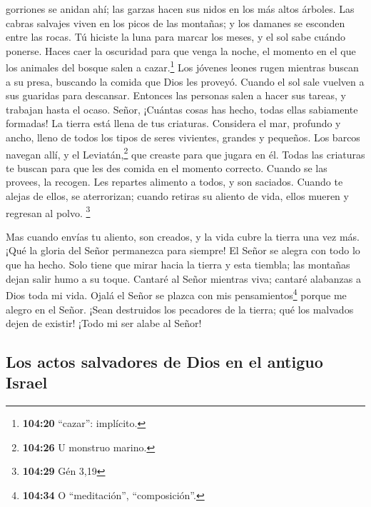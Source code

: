 gorriones se anidan ahí; las garzas hacen sus nidos en los más altos
árboles.  Las cabras salvajes viven en los picos de las
montañas; y los damanes se esconden entre las rocas.  Tú
hiciste la luna para marcar los meses, y el sol sabe cuándo ponerse.
 Haces caer la oscuridad para que venga la noche, el
momento en el que los animales del bosque salen a cazar.\footnote{\textbf{104:20}
  ``cazar'': implícito.}  Los jóvenes leones rugen
mientras buscan a su presa, buscando la comida que Dios les proveyó.
 Cuando el sol sale vuelven a sus guaridas para
descansar.  Entonces las personas salen a hacer sus
tareas, y trabajan hasta el ocaso.  Señor, ¡Cuántas cosas
has hecho, todas ellas sabiamente formadas! La tierra está llena de tus
criaturas.  Considera el mar, profundo y ancho, lleno de
todos los tipos de seres vivientes, grandes y pequeños. 
Los barcos navegan allí, y el Leviatán,\footnote{\textbf{104:26} U
  monstruo marino.} que creaste para que jugara en él. 
Todas las criaturas te buscan para que les des comida en el momento
correcto.  Cuando se las provees, la recogen. Les
repartes alimento a todos, y son saciados.  Cuando te
alejas de ellos, se aterrorizan; cuando retiras su aliento de vida,
ellos mueren y regresan al polvo. \footnote{\textbf{104:29} Gén 3,19}

 Mas cuando envías tu aliento, son creados, y la vida
cubre la tierra una vez más.  ¡Qué la gloria del Señor
permanezca para siempre! El Señor se alegra con todo lo que ha hecho.
 Solo tiene que mirar hacia la tierra y esta tiembla; las
montañas dejan salir humo a su toque.  Cantaré al Señor
mientras viva; cantaré alabanzas a Dios toda mi vida. 
Ojalá el Señor se plazca con mis pensamientos\footnote{\textbf{104:34} O
  ``meditación'', ``composición''.} porque me alegro en el Señor.
 ¡Sean destruidos los pecadores de la tierra; qué los
malvados dejen de existir! ¡Todo mi ser alabe al Señor!

\hypertarget{los-actos-salvadores-de-dios-en-el-antiguo-israel}{%
\subsection{Los actos salvadores de Dios en el antiguo
Israel}\label{los-actos-salvadores-de-dios-en-el-antiguo-israel}}

